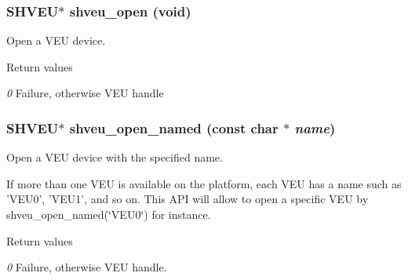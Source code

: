\subsubsection[{shveu\_\-open}]{\setlength{\rightskip}{0pt plus 5cm}SHVEU$\ast$ shveu\_\-open (void)}\label{shveu_8h_a36e1f248a22ae4d8b9f7e9c40acd546b}


Open a VEU device. 


\begin{DoxyRetVals}{Return values}
\item[{\em 0}]Failure, otherwise VEU handle \end{DoxyRetVals}
\subsubsection[{shveu\_\-open\_\-named}]{\setlength{\rightskip}{0pt plus 5cm}SHVEU$\ast$ shveu\_\-open\_\-named (const char $\ast$ {\em name})}\label{shveu_8h_a51a60b82b1133934636d58da0b9d2692}


Open a VEU device with the specified name. 

If more than one VEU is available on the platform, each VEU has a name such as 'VEU0', 'VEU1', and so on. This API will allow to open a specific VEU by shveu\_\-open\_\-named(\char`\"{}VEU0\char`\"{}) for instance. 
\begin{DoxyRetVals}{Return values}
\item[{\em 0}]Failure, otherwise VEU handle. \end{DoxyRetVals}
